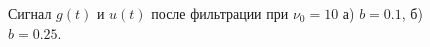 \documentclass[a5paper, 10pt]{article}
\theoremstyle{definition}
\theoremstyle{plain}
\theoremstyle{remark}
\begin{document}
\begin{figure}[h!]
\begin{minipage}[h]{0.5\linewidth}
\end{minipage}
\hfill
\begin{minipage}[h]{0.5\linewidth}
\end{minipage}
\caption{Сигнал $g(t)$ и $u(t)$ после фильтрации при $\nu_0 = 10$ а) $b=0.1$, б) $b=0.25$.}


\end{figure}
\end{document}
